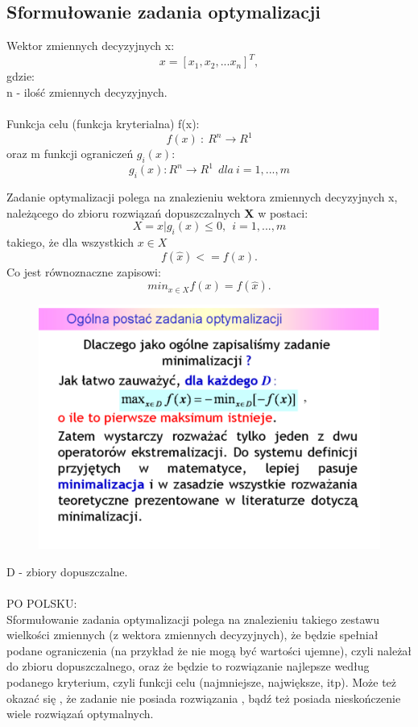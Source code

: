 \documentclass[a4paper,twoside]{report}
\begin{document}
\subsection{Sformułowanie zadania optymalizacji}


Wektor zmiennych decyzyjnych x:
\[x=[x_1, x_2,...x_n]^T,\]
gdzie:\\
n - ilość zmiennych decyzyjnych.
\\\\
Funkcja celu (funkcja kryterialna) f(x):  
\[f(x)~:~R^n \longrightarrow R^1\]
oraz m funkcji ograniczeń $g_i(x)$:
\[g_i(x): R^n \longrightarrow R^1~~dla~i=1,...,m\]

Zadanie optymalizacji polega na znalezieniu wektora zmiennych decyzyjnych 
x, należącego do zbioru rozwiązań dopuszczalnych \textbf{X} w postaci:
\[X = {x|g_i(x) \le 0,~~i=1,...,m}\]
takiego, że dla wszystkich $x \in X$
\[f(\hat{x})<= f(x).\]
Co jest równoznaczne zapisowi:
\[min_{x \in X} f(x) = f(\hat{x}).\]


\begin{figure}[H]
	\includegraphics[scale=1.2
	]{obrazy/optymalizacja/opt1.png}
\end{figure}
D - zbiory dopuszczalne.\\
\\


PO POLSKU: \\

Sformułowanie zadania optymalizacji polega na znalezieniu takiego zestawu wielkości zmiennych (z wektora zmiennych decyzyjnych), że będzie spełniał podane ograniczenia (na przykład że nie mogą być wartości ujemne), czyli należał do zbioru dopuszczalnego, oraz że będzie to rozwiązanie najlepsze według podanego kryterium, czyli funkcji celu (najmniejsze, największe, itp). Może też okazać się , że zadanie nie posiada rozwiązania , bądź też posiada nieskończenie wiele rozwiązań optymalnych. \\
\end{document}
